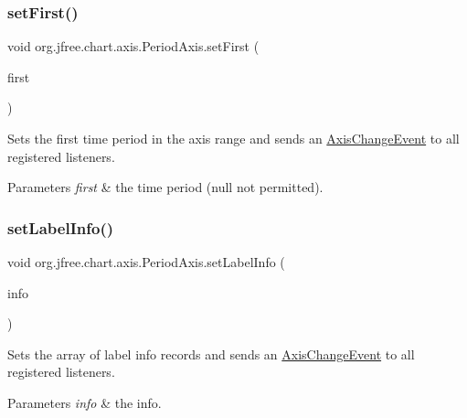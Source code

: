 \subsubsection{\texorpdfstring{set\+First()}{setFirst()}}
{\footnotesize\ttfamily void org.\+jfree.\+chart.\+axis.\+Period\+Axis.\+set\+First (\begin{DoxyParamCaption}\item[{\mbox{\hyperlink{classorg_1_1jfree_1_1data_1_1time_1_1_regular_time_period}{Regular\+Time\+Period}}}]{first }\end{DoxyParamCaption})}

Sets the first time period in the axis range and sends an \mbox{\hyperlink{}{Axis\+Change\+Event}} to all registered listeners.


\begin{DoxyParams}{Parameters}
{\em first} & the time period ({\ttfamily null} not permitted). \\
\hline
\end{DoxyParams}
\mbox{\label{classorg_1_1jfree_1_1chart_1_1axis_1_1_period_axis_aa8eb231afbaa38447b96f2b31ea58321}} 
\subsubsection{\texorpdfstring{set\+Label\+Info()}{setLabelInfo()}}
{\footnotesize\ttfamily void org.\+jfree.\+chart.\+axis.\+Period\+Axis.\+set\+Label\+Info (\begin{DoxyParamCaption}\item[{\mbox{\hyperlink{classorg_1_1jfree_1_1chart_1_1axis_1_1_period_axis_label_info}{Period\+Axis\+Label\+Info}} \mbox{[}$\,$\mbox{]}}]{info }\end{DoxyParamCaption})}

Sets the array of label info records and sends an \mbox{\hyperlink{}{Axis\+Change\+Event}} to all registered listeners.


\begin{DoxyParams}{Parameters}
{\em info} & the info. \\
\hline
\end{DoxyParams}
\mbox{\label{classorg_1_1jfree_1_1chart_1_1axis_1_1_period_axis_a018f27da82444f306b9757c4be7a5cc8}} 
